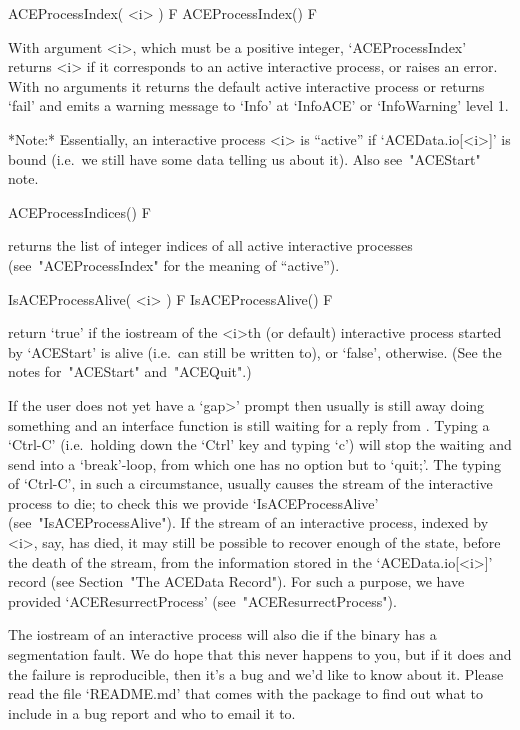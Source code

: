 
\>ACEProcessIndex( <i> ) F
\>ACEProcessIndex() F

With argument <i>, which must be a positive integer, `ACEProcessIndex'
returns <i> if it corresponds to an  active  interactive  process,  or
raises an error. With no  arguments  it  returns  the  default  active
interactive process or returns `fail' and emits a warning  message  to
`Info' at `InfoACE' or `InfoWarning' level 1.

*Note:*
Essentially, an  interactive  {\ACE}  process  <i>  is  ``active''  if
`ACEData.io[<i>]' is bound (i.e.~we still have some  data  telling  us
about it). Also see~"ACEStart" note.

\>ACEProcessIndices() F

returns the list of integer indices of all active  interactive  {\ACE}
processes (see~"ACEProcessIndex" for the meaning of ``active'').

\>IsACEProcessAlive( <i> ) F
\>IsACEProcessAlive() F

return `true' if  the  {\GAP}  iostream  of  the  <i>th  (or  default)
interactive {\ACE} process started by `ACEStart'  is  alive  (i.e.~can
still  be  written  to),  or  `false',  otherwise.  (See   the   notes
for~"ACEStart" and~"ACEQuit".)

If the user does not yet have a `gap>' prompt then usually  {\ACE}  is
still away doing something and an {\ACE} interface function  is  still
waiting for a reply from {\ACE}. Typing a `Ctrl-C' (i.e.~holding  down
the `Ctrl' key and typing `c') will stop the waiting and  send  {\GAP}
into a `break'-loop, from which one has no option but to `quit;'.  The
typing of `Ctrl-C', in such a circumstance, usually causes the  stream
of the interactive {\ACE} process to die; to  check  this  we  provide
`IsACEProcessAlive' (see~"IsACEProcessAlive"). If  the  stream  of  an
interactive {\ACE} process, indexed by <i>,  say,  has  died,  it  may
still be possible to recover enough of the state, before the death  of
the stream, from  the  information  stored  in  the  `ACEData.io[<i>]'
record (see Section~"The ACEData Record"). For such a purpose, we have
provided `ACEResurrectProcess' (see~"ACEResurrectProcess").

The {\GAP} iostream of an interactive {\ACE} process will also die  if
the {\ACE} binary has a segmentation fault. We do hope that this never
happens to you, but if it does and the failure is  reproducible,  then
it's a bug and we'd like to know about it. Please read the file `README.md'
that comes with the {\ACE} package to find out what to  include  in  a
bug report and who to email it to.

